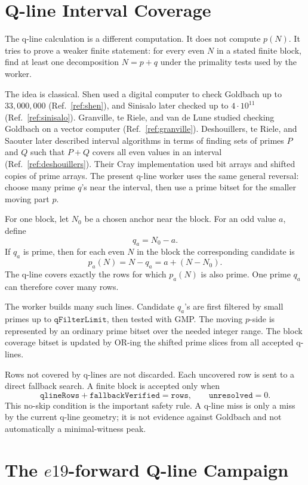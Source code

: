 \documentclass[11pt]{article}
\begin{document}
\section{Q-line Interval Coverage}

The q-line calculation is a different computation. It does not compute
\(p(N)\). It tries to prove a weaker finite statement: for every even \(N\) in
a stated finite block, find at least one decomposition \(N=p+q\) under the
primality tests used by the worker.

The idea is classical. Shen used a digital computer to check Goldbach up to
\(33{,}000{,}000\) (Ref.~\ref{ref:shen}), and Sinisalo later checked up to
\(4\cdot10^{11}\) (Ref.~\ref{ref:sinisalo}). Granville, te Riele, and van de
Lune studied checking Goldbach on a vector computer
(Ref.~\ref{ref:granville}).
Deshouillers, te Riele, and Saouter later described interval algorithms in
terms of finding sets of primes \(P\) and \(Q\) such that \(P+Q\) covers all
even values in an interval (Ref.~\ref{ref:deshouillers}). Their Cray
implementation used bit arrays and shifted copies of prime arrays. The present
q-line worker uses the same general reversal: choose many prime \(q\)'s near
the interval, then use a prime bitset for the smaller moving part \(p\).

For one block, let \(N_0\) be a chosen anchor near the block. For an odd value
\(a\), define
\[
  q_a=N_0-a.
\]
If \(q_a\) is prime, then for each even \(N\) in the block the corresponding
candidate is
\[
  p_a(N)=N-q_a=a+(N-N_0).
\]
The q-line covers exactly the rows for which \(p_a(N)\) is also prime. One
prime \(q_a\) can therefore cover many rows.

The worker builds many such lines. Candidate \(q_a\)'s are first filtered by
small primes up to \(\texttt{qFilterLimit}\), then tested with GMP. The moving
\(p\)-side is represented by an ordinary prime bitset over the needed
integer range. The block coverage bitset is updated by OR-ing the shifted
prime slices from all accepted q-lines.

Rows not covered by q-lines are not discarded. Each uncovered row is sent to a
direct fallback search. A finite block is accepted only when
\[
  \texttt{qlineRows}+\texttt{fallbackVerified}=\texttt{rows},
  \qquad
  \texttt{unresolved}=0.
\]
This no-skip condition is the important safety rule. A q-line miss is only a
miss by the current q-line geometry; it is not evidence against Goldbach and
not automatically a minimal-witness peak.

\section{\texorpdfstring{The \(e19\)-forward Q-line Campaign}{The e19-forward Q-line Campaign}}
\end{document}
